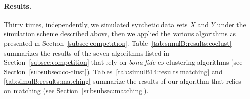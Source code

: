\paragraph*{Results.}
Thirty  times, independently,  we simulated  synthetic data  sets $X$  and $Y$
under  the simulation  scheme described  above,  then we  applied the  various
algorithms      as     presented      in     Section~\ref{subsec:competition}.
Table~\ref{tab:simulB:results:coclust}  summarizes the  results  of the  seven
algorithms   listed   in   Section~\ref{subsec:competition}   that   rely   on
\textit{bona         fide}        co-clustering         algorithms        (see
Section~\ref{subsubsec:co-clust}).  Tables~\ref{tab:simulB14:results:matching}
and \ref{tab:simulB:results:matching}  summarize the results of  our algorithm
that relies on matching (see Section~\ref{subsubsec:matching}).
